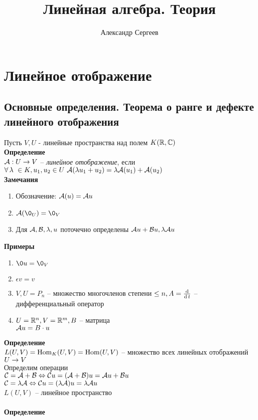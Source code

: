 \documentclass[12pt]{article}
\title{Линейная алгебра. Теория}
\author{Александр Сергеев}
\date{}
\begin{document}
\maketitle
\section{Линейное отображение}
\subsection{Основные определения. Теорема о ранге и дефекте линейного отображения}
Пусть $V, U$ - линейные пространства над полем $K(\mathbb{R}, \mathbb{C})$\\
\textbf{Определение}\\
$\mathcal{A}: U \rightarrow V$ -- \textit{линейное отображение}, если $\forall\, \lambda\ \in K, u_1, u_2 \in U\ \mathcal{A}(\lambda u_1 + u_2) = \lambda \mathcal{A}(u_1) + \mathcal{A}(u_2)$\\
\textbf{Замечания}
\begin{enumerate}
    \item Обозначение: $\mathcal{A}(u) = \mathcal{A} u$
    \item $\mcA(\0_U) = \0_V$
    \item Для $\mathcal{A}, \mathcal{B}, \lambda, u$ поточечно определены $\mathcal{A} u+\mathcal{B} u, \lambda \mathcal{A} u$
\end{enumerate}
\textbf{Примеры}
\begin{enumerate}
    \item $\0 u = \0_V$
    \item $\epsilon v = v$
    \item $V, U = P_n$ -- множество многочленов степени $\leq n, A = \frac{\operatorname{d}}{\operatorname{d} t}$ -- дифференциальный оператор
    \item $U = \mathbb{R}^n, V = \mathbb{R}^m, B$ -- матрица\\
    $\mathcal{A} u = B\cdot u$
\end{enumerate}
\textbf{Определение}\\
$L(U, V) = \operatorname{Hom}_K(U, V) = \operatorname{Hom}(U, V)$ -- множество всех линейных отображений $U \rightarrow V$\\
Определим операции\\
$\mathcal{C} = \mathcal{A} + \mathcal{B} \Leftrightarrow \mathcal{C} u=(\mathcal{A}+\mathcal{B})u = \mathcal{A} u+\mathcal{B} u$\\
$\mathcal{C} = \lambda \mathcal{A} \Leftrightarrow \mathcal{C} u=(\lambda \mathcal{A})u = \lambda \mathcal{A} u$\\
$L(U,V)$ -- линейное пространство\\\\
\textbf{Определение}\\
\end{document}
